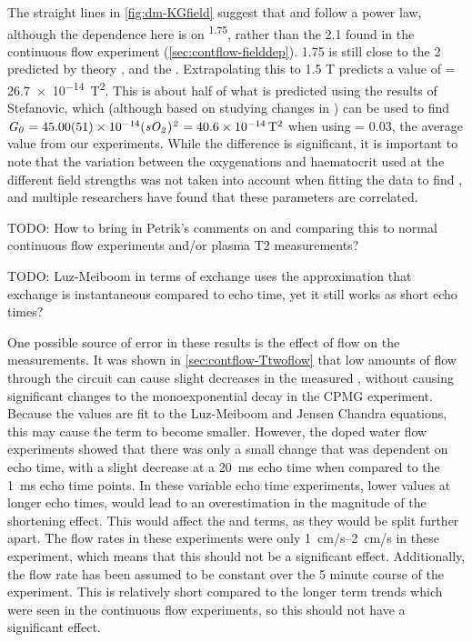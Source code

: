 The straight lines in \autoref{fig:dm-KGfield} suggest that \Kzero and \Gzero follow a power law, although the dependence here is on \Bzero\textsuperscript{1.75}, rather than the \num{2.1} found in the continuous flow experiment (\autoref{sec:contflow-fielddep}).
1.75 is still close to the 2 predicted by theory \cite[Eq. 52-54]{JensenNMRrelaxationtissues2000}, and the .
Extrapolating this to 1.5 T predicts a value of \Gzero = \SI{26.7e-14}{T^2}.
This is about half of what is predicted using the results of Stefanovic, which (although based on studying changes in \SOtwo) can be used to find $\mathit{G_0} = \num{45\pm0.51e-14}  \mathit{(sO_2)^2} = \SI{40.6e-14}{T^2}$ when using \SOtwo = 0.03, the average value from our experiments.
While the difference is significant, it is important to note that the variation between the oxygenations and haematocrit used at the different field strengths was not taken into account when fitting the data to find \Gzero, and multiple researchers \cite{StefanovicHumanwholebloodrelaxometry2004,ChenHumanwholeblood2009,GardenerDependencebloodR22010} have found that these parameters are correlated.

TODO: How to bring in Petrik's comments on \TtwoO and comparing this to normal continuous flow experiments and/or plasma T2 measurements?

TODO: Luz-Meiboom in terms of exchange uses the approximation that exchange is instantaneous compared to echo time, yet it still works as short echo times?

One possible source of error in these results is the effect of flow on the \Ttwo measurements.
It was shown in \autoref{sec:contflow-Ttwoflow} that low amounts of flow through the circuit can cause slight decreases in the measured \Ttwo, without causing significant changes to the monoexponential decay in the CPMG experiment.
Because the \Ttwo values are fit to the Luz-Meiboom and Jensen Chandra equations, this may cause the \TtwoO term to become smaller.
However, the doped water flow experiments showed that there was only a small change that was dependent on echo time, with a slight decrease at a \SI{20}{ms} echo time when compared to the \SI{1}{ms} echo time points.
In these variable echo time experiments, lower \Ttwo values at longer echo times, would lead to an overestimation in the magnitude of the \Ttwo shortening effect.
This would affect the \Kzero and \Gzero terms, as they would be split further apart.
The flow rates in these experiments were only \SIrange{1}{2}{cm/s} in these experiment, which means that this should not be a significant effect.
Additionally, the flow rate has been assumed to be constant over the 5 minute course of the experiment.
This is relatively short compared to the longer term trends which were seen in the continuous flow experiments, so this should not have a significant effect.

